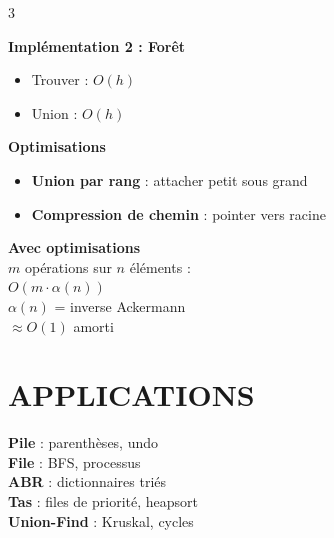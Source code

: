 \documentclass[10pt,a4paper,landscape]{article}
\begin{document}
\begin{multicols}{3}
\begin{importbox}
\textbf{Implémentation 2 : Forêt}
\begin{itemize}
\item Trouver : $O(h)$
\item Union : $O(h)$
\end{itemize}
\end{importbox}

\begin{defbox}
\textbf{Optimisations}
\begin{itemize}
\item \textbf{Union par rang} : attacher petit sous grand
\item \textbf{Compression de chemin} : pointer vers racine
\end{itemize}
\end{defbox}

\begin{complexbox}
\textbf{Avec optimisations}\\
$m$ opérations sur $n$ éléments :\\
$O(m \cdot \alpha(n))$ \\
$\alpha(n)$ = inverse Ackermann\\
$\approx O(1)$ amorti
\end{complexbox}

\vfill

\section*{\color{titrebleu}APPLICATIONS}

\begin{importbox}
\textbf{Pile} : parenthèses, undo\\
\textbf{File} : BFS, processus\\
\textbf{ABR} : dictionnaires triés\\
\textbf{Tas} : files de priorité, heapsort\\
\textbf{Union-Find} : Kruskal, cycles
\end{importbox}

\end{multicols}
\end{document}
